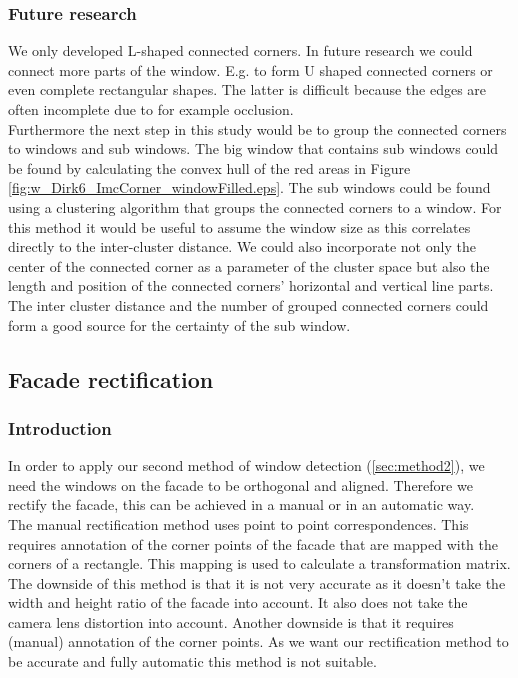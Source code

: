 \subsubsection{Future research} %
We only developed L-shaped connected corners. In future research we could
connect more parts of the window. E.g. to form U shaped connected corners or
even complete rectangular shapes. The latter is difficult because the edges are
often incomplete due to for example occlusion.\\

Furthermore the next step in this study would be to group the connected corners
to windows and sub windows.  The big window that contains sub windows could be
found by calculating the convex hull of the red areas in Figure
\ref{fig:w_Dirk6_ImcCorner_windowFilled.eps}.  The sub windows could be found
using a clustering algorithm that groups the connected corners to a window. For
this method it would be useful to assume the window size as this correlates
directly to the inter-cluster distance.  
We could also incorporate not only the center of the connected corner as a
parameter of the cluster space but also the length and position of the
connected corners' horizontal and vertical line parts.  The inter cluster
distance and the number of grouped connected corners could form a good source for
the certainty of the sub window.\\







\subsection{Facade rectification}
\subsubsection{Introduction}
In order to apply our second method of window detection (\ref{sec:method2}),
we need the windows on the facade to be orthogonal and aligned.
Therefore we rectify the facade, this can be achieved in a manual or in an automatic way.\\

The manual rectification method uses point to point correspondences. This 
requires annotation of the corner points of the facade that are mapped with the
corners of a rectangle. This mapping is used to calculate a transformation matrix. 
 The downside of this method is that it is not very accurate as it doesn't take
 the width and height ratio of the facade into account.
It also does not take the camera lens distortion into account.
 Another downside is that it requires (manual) annotation of the corner points.
As we want our rectification method to be accurate and fully automatic this
method is not suitable.\\

